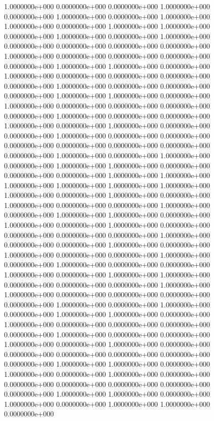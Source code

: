   1.0000000e+000  0.0000000e+000  0.0000000e+000  1.0000000e+000  0.0000000e+000
  1.0000000e+000  0.0000000e+000  1.0000000e+000  1.0000000e+000  0.0000000e+000
  1.0000000e+000  1.0000000e+000  0.0000000e+000  1.0000000e+000  0.0000000e+000
  1.0000000e+000  0.0000000e+000  0.0000000e+000  0.0000000e+000  0.0000000e+000
  1.0000000e+000  0.0000000e+000  0.0000000e+000  0.0000000e+000  0.0000000e+000
  1.0000000e+000  1.0000000e+000  0.0000000e+000  1.0000000e+000  0.0000000e+000
  0.0000000e+000  0.0000000e+000  0.0000000e+000  1.0000000e+000  0.0000000e+000
  0.0000000e+000  0.0000000e+000  1.0000000e+000  1.0000000e+000  0.0000000e+000
  1.0000000e+000  0.0000000e+000  0.0000000e+000  0.0000000e+000  0.0000000e+000
  1.0000000e+000  0.0000000e+000  0.0000000e+000  1.0000000e+000  0.0000000e+000
  1.0000000e+000  0.0000000e+000  0.0000000e+000  1.0000000e+000  0.0000000e+000
  0.0000000e+000  0.0000000e+000  0.0000000e+000  0.0000000e+000  0.0000000e+000
  0.0000000e+000  1.0000000e+000  0.0000000e+000  1.0000000e+000  0.0000000e+000
  1.0000000e+000  1.0000000e+000  0.0000000e+000  0.0000000e+000  0.0000000e+000
  1.0000000e+000  1.0000000e+000  1.0000000e+000  1.0000000e+000  1.0000000e+000
  1.0000000e+000  1.0000000e+000  0.0000000e+000  1.0000000e+000  0.0000000e+000
  1.0000000e+000  0.0000000e+000  0.0000000e+000  1.0000000e+000  0.0000000e+000
  1.0000000e+000  1.0000000e+000  0.0000000e+000  1.0000000e+000  0.0000000e+000
  1.0000000e+000  0.0000000e+000  0.0000000e+000  0.0000000e+000  0.0000000e+000
  1.0000000e+000  0.0000000e+000  0.0000000e+000  1.0000000e+000  0.0000000e+000
  1.0000000e+000  0.0000000e+000  0.0000000e+000  1.0000000e+000  0.0000000e+000
  1.0000000e+000  0.0000000e+000  0.0000000e+000  1.0000000e+000  0.0000000e+000
  1.0000000e+000  1.0000000e+000  0.0000000e+000  0.0000000e+000  0.0000000e+000
  1.0000000e+000  1.0000000e+000  0.0000000e+000  0.0000000e+000  0.0000000e+000
  0.0000000e+000  1.0000000e+000  0.0000000e+000  1.0000000e+000  0.0000000e+000
  1.0000000e+000  1.0000000e+000  0.0000000e+000  1.0000000e+000  0.0000000e+000
  0.0000000e+000  0.0000000e+000  0.0000000e+000  1.0000000e+000  0.0000000e+000
  0.0000000e+000  1.0000000e+000  0.0000000e+000  1.0000000e+000  0.0000000e+000
  0.0000000e+000  0.0000000e+000  0.0000000e+000  0.0000000e+000  0.0000000e+000
  1.0000000e+000  1.0000000e+000  0.0000000e+000  1.0000000e+000  0.0000000e+000
  1.0000000e+000  0.0000000e+000  0.0000000e+000  0.0000000e+000  0.0000000e+000
  0.0000000e+000  0.0000000e+000  1.0000000e+000  1.0000000e+000  0.0000000e+000
  1.0000000e+000  0.0000000e+000  1.0000000e+000  1.0000000e+000  0.0000000e+000
